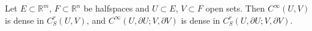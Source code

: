 Let $E \subset \mathbb{R}^m$, $F \subset \mathbb{R}^n$ be halfspaces and $U \subset E$, $V \subset F$ open sets. Then $C^\infty(U,V)$ is dense in $C_S^r(U,V)$, and $C^\infty(U,\partial U; V,\partial V)$ is dense in $C_S^r(U,\partial U; V,\partial V)$.
